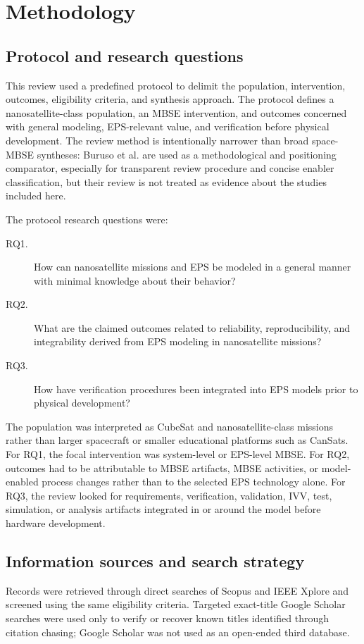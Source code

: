 \section{Methodology}

\subsection{Protocol and research questions}
This review used a predefined protocol to delimit the population, intervention, outcomes, eligibility criteria, and synthesis approach.  The protocol defines a nanosatellite-class population, an MBSE intervention, and outcomes concerned with general modeling, EPS-relevant value, and verification before physical development.  The review method is intentionally narrower than broad space-MBSE syntheses: Buruso et al. \cite{Buruso2026MBSESpace} are used as a methodological and positioning comparator, especially for transparent review procedure and concise enabler classification, but their review is not treated as evidence about the studies included here.

The protocol research questions were:
\begin{description}
\item[RQ1.] How can nanosatellite missions and EPS be modeled in a general manner with minimal knowledge about their behavior?
\item[RQ2.] What are the claimed outcomes related to reliability, reproducibility, and integrability derived from EPS modeling in nanosatellite missions?
\item[RQ3.] How have verification procedures been integrated into EPS models prior to physical development?
\end{description}

The population was interpreted as CubeSat and nanosatellite-class missions rather than larger spacecraft or smaller educational platforms such as CanSats.  For RQ1, the focal intervention was system-level or EPS-level MBSE.  For RQ2, outcomes had to be attributable to MBSE artifacts, MBSE activities, or model-enabled process changes rather than to the selected EPS technology alone.  For RQ3, the review looked for requirements, verification, validation, IVV, test, simulation, or analysis artifacts integrated in or around the model before hardware development.

\subsection{Information sources and search strategy}
Records were retrieved through direct searches of Scopus and IEEE Xplore and screened using the same eligibility criteria.  Targeted exact-title Google Scholar searches were used only to verify or recover known titles identified through citation chasing; Google Scholar was not used as an open-ended third database.

